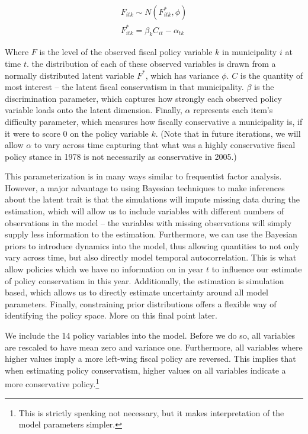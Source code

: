 \documentclass[a4paper,12pt]{article}
\begin{document}
\begin{gather*}
F_{itk} \sim N(F^*_{itk}, \phi)\\
F^*_{itk} = \beta_k C_{it} - \alpha_{tk}
\end{gather*}

\noindent Where $F$ is the level of the observed fiscal policy variable $k$ in municipality $i$ at time $t$. the distribution of each of these observed variables is drawn from a normally distributed latent variable $F^*$, which has variance $\phi$. $C$ is the quantity of most interest -- the latent fiscal conservatism in that municipality. $\beta$ is the discrimination parameter, which captures how strongly each observed policy variable loads onto the latent dimension. Finally, $\alpha$ represents each item's difficulty parameter, which measures how fiscally conservative a municipality is, if it were to score 0 on the policy variable $k$. (Note that in future iterations, we will allow $\alpha$ to vary across time capturing that what was a highly conservative fiscal policy stance in 1978 is not necessarily as conservative in 2005.)

This parameterization is in many ways similar to frequentist factor analysis. However, a major advantage to using Bayesian techniques to make inferences about the latent trait is that the simulations will impute missing data during the estimation, which will allow us to include variables with different numbers of observations in the model -- the variables with missing observations will simply supply less information to the estimation. Furthermore, we can use the Bayesian priors to introduce dynamics into the model, thus allowing quantities to not only vary across time, but also directly model temporal autocorrelation. This is what allow policies which we have no information on in year $t$ to influence our estimate of policy conservatism in this year. Additionally, the estimation is simulation based, which allows us to directly estimate uncertainty around all model parameters. Finally, constraining prior distributions offers a flexible way of identifying the policy space. More on this final point later.

We include the 14 policy variables into the model. Before we do so, all variables are rescaled to have mean zero and variance one. Furthermore, all variables where higher values imply a more left-wing fiscal policy are reversed. This implies that when estimating policy conservatism, higher values on all variables indicate a more conservative policy.\footnote{This is strictly speaking not necessary, but it makes interpretation of the model parameters simpler.}
\end{document}

